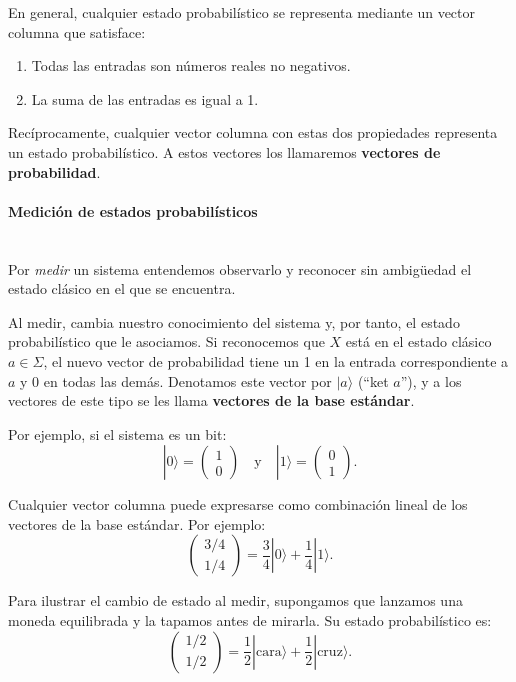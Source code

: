 \documentclass[12pt, a4paper]{article}
\begin{document}
\noindent En general, cualquier estado probabilístico se representa mediante un vector columna que satisface:
\begin{enumerate}
    \item Todas las entradas son números reales no negativos.
    \item La suma de las entradas es igual a 1.
\end{enumerate}

\noindent Recíprocamente, cualquier vector columna con estas dos propiedades representa un estado probabilístico. A estos vectores los llamaremos \textbf{vectores de probabilidad}.

\paragraph{Medición de estados probabilísticos}\mbox{}\\

\noindent Por \textit{medir} un sistema entendemos observarlo y reconocer sin ambigüedad el estado clásico en el que se encuentra.

\noindent Al medir, cambia nuestro conocimiento del sistema y, por tanto, el estado probabilístico que le asociamos. Si reconocemos que $X$ está en el estado clásico $a \in \Sigma$, el nuevo vector de probabilidad tiene un 1 en la entrada correspondiente a $a$ y 0 en todas las demás. Denotamos este vector por $|a\rangle$ (``ket $a$''), y a los vectores de este tipo se les llama \textbf{vectores de la base estándar}.

Por ejemplo, si el sistema es un bit:
\[ |0\rangle = \begin{pmatrix} 1 \\ 0 \end{pmatrix} \quad \text{y} \quad |1\rangle = \begin{pmatrix} 0 \\ 1 \end{pmatrix}. \]

Cualquier vector columna puede expresarse como combinación lineal de los vectores de la base estándar. Por ejemplo:
\[ \begin{pmatrix} 3/4 \\ 1/4 \end{pmatrix} = \frac{3}{4}|0\rangle + \frac{1}{4}|1\rangle. \]

Para ilustrar el cambio de estado al medir, supongamos que lanzamos una moneda equilibrada y la tapamos antes de mirarla. Su estado probabilístico es:
\[ \begin{pmatrix} 1/2 \\ 1/2 \end{pmatrix} = \frac{1}{2}|\text{cara}\rangle + \frac{1}{2}|\text{cruz}\rangle. \]
\end{document}
